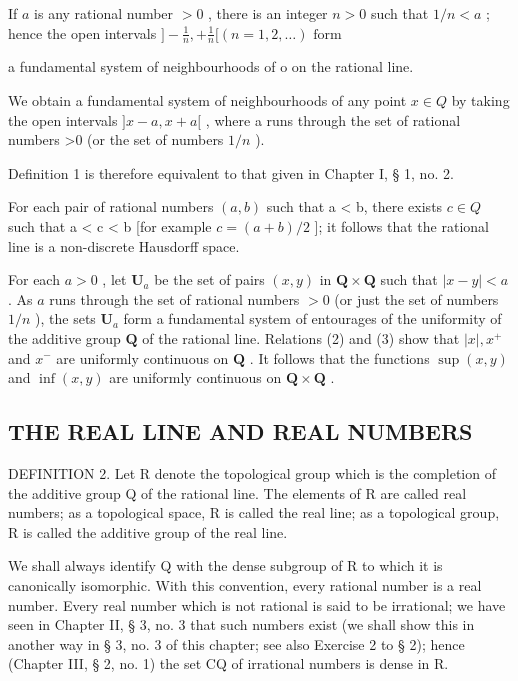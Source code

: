 If \(a\) is any rational number \(> 0\) , there is an integer \(n > 0\) such that \(1 / n < a\) ; hence the open intervals \(] - \frac{1}{n}, + \frac{1}{n} [ (n = 1, 2, \ldots) \text{ form}\)

a fundamental system of neighbourhoods of o on the rational line.

We obtain a fundamental system of neighbourhoods of any point \(x \in Q\) by taking the open intervals \(]x - a, x + a[\) , where a runs through the set of rational numbers \textgreater0 (or the set of numbers \(1/n\) ).

Definition 1 is therefore equivalent to that given in Chapter I, § 1, no. 2.

For each pair of rational numbers \((a, b)\) such that a \textless{} b, there exists \(c \in Q\) such that a \textless{} c \textless{} b {[}for example \(c = (a + b)/2\) {]}; it follows that the rational line is a non-discrete Hausdorff space.

For each \(a > 0\) , let \(\mathbf{U}_a\) be the set of pairs \((x, y)\) in \(\mathbf{Q} \times \mathbf{Q}\) such that \(|x - y| < a\) . As \(a\) runs through the set of rational numbers \(> 0\) (or just the set of numbers \(1/n\) ), the sets \(\mathbf{U}_a\) form a fundamental system of entourages of the uniformity of the additive group \(\mathbf{Q}\) of the rational line. Relations (2) and (3) show that \(|x|, x^+\) and \(x^-\) are uniformly continuous on \(\mathbf{Q}\) . It follows that the functions \(\sup (x, y)\) and \(\inf (x, y)\) are uniformly continuous on \(\mathbf{Q} \times \mathbf{Q}\) .

\subsection{THE REAL LINE AND REAL NUMBERS}

DEFINITION 2. Let R denote the topological group which is the completion of the additive group Q of the rational line. The elements of R are called real numbers; as a topological space, R is called the real line; as a topological group, R is called the additive group of the real line.

We shall always identify Q with the dense subgroup of R to which it is canonically isomorphic. With this convention, every rational number is a real number. Every real number which is not rational is said to be irrational; we have seen in Chapter II, § 3, no. 3 that such numbers exist (we shall show this in another way in § 3, no. 3 of this chapter; see also Exercise 2 to § 2); hence (Chapter III, § 2, no. 1) the set CQ of irrational numbers is dense in R.


